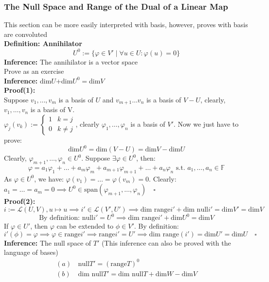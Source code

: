 \documentclass{article}
\newcommand{\F}{\mathbb{F}}
\newcommand{\st}{\mbox{ s.t. }}
\newcommand{\0}{{\bf{0}}}
\begin{document}
\subsubsection{The Null Space and Range of the Dual of a Linear Map}
This section can be more easily interpreted with basis, however, proves with basis are convoluted\\
\textbf{Definition: Annihilator}
$$U^0:=\{\varphi\in V'\mid\forall u\in U:\varphi(u)=0\}$$
\textbf{Inference: }The annihilator is a vector space\\
\null\hfill{Prove as an exercise}\\
\textbf{Inference:} dim$U$+dim$U^0=$dim$V$\\
\textbf{Proof(1):}\\
Suppose $v_1,\dots,v_m$ is a basis of $U$ and $v_{m+1}\dots v_n$ is a basis of $V-U$, clearly, $v_1,\dots,v_n$ is a basis of V.\\
$\varphi_j(v_k):=\begin{cases}
    1&k=j\\
    0&k\neq j
\end{cases}$, clearly $\varphi_1,\dots,\varphi_n$ is a basis of $V'$. Now we just have to prove:
$$\mbox{dim}U^0=\mbox{dim}(V-U)=\mbox{dim}V-\mbox{dim}U$$
Clearly, $\varphi_{m+1},\dots,\varphi_{n}\in U^0$. Suppose $\exists\varphi\in U^0$, then:
$$\varphi=a_1\varphi_1+\dots+a_m\varphi_m+a_{m+1}\varphi_{m+1}+\dots+a_n\varphi_n\st a_1,\dots,a_n\in\F$$
As $\varphi\in U^0$, we have: $\varphi(v_1)=\dots=\varphi(v_m)=0$. Clearly: $a_1=\dots=a_m=0\implies U^0\in\mbox{span}(\varphi_{m+1},\dots,\varphi_n)\quad\square$\\
\textbf{Proof(2):}
$$i:=\mathcal{L}(U,V),u\mapsto u\implies i'\in\mathcal{L}(V',U')\implies\mbox{dim range}i'+\mbox{dim null}i'=\mbox{dim}V'=\mbox{dim}V$$
$$\mbox{By definition: null}i'=U^0\implies\mbox{dim range}i'+\mbox{dim}U^0=\mbox{dim}V$$
If $\varphi\in U'$, then $\varphi$ can be extended to $\phi\in V'$. By definition:
$$i'(\phi)=\varphi\implies\varphi\in\mbox{range}i'\implies\mbox{range}i'=U'\implies\mbox{dim range}(i')=\mbox{dim}U'=\mbox{dim}U\quad\square$$
\textbf{Inference:} The null space of $T'$ (This inference can also be proved with the language of bases)
\begin{equation}
\begin{split}
    (a)\,&\mbox{null}T'=(\mbox{range}T)^0\\
    (b)\,&\mbox{dim null}T'=\mbox{dim null}T+\mbox{dim}W-\mbox{dim}V
\end{split}
\end{equation}
\end{document}
